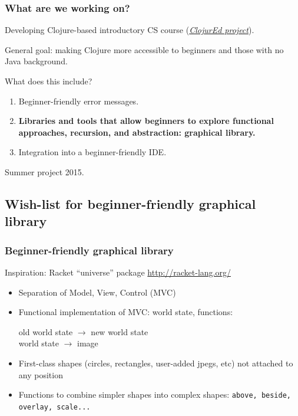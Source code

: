 \documentclass{beamer}
\begin{document}
\begin{frame}
\frametitle{What are we working on?}
Developing Clojure-based introductory CS course ({\it \href{http://cda.morris.umn.edu/~elenam/\#clojure}{ClojurEd project}}). 

General goal: making Clojure more accessible to beginners and those with no Java background. 

What does this include? 
\begin{enumerate}
\item Beginner-friendly error messages. 
\item {\bf Libraries and tools that allow beginners to explore functional approaches, recursion, and abstraction: graphical library.}
\item Integration into a beginner-friendly IDE. 
\end{enumerate}
Summer project 2015. 
\end{frame}

\subsection{Wish-list for beginner-friendly graphical library}

\begin{frame}
\frametitle{Beginner-friendly graphical library}
Inspiration: Racket ``universe'' package \href{http://racket-lang.org/}{http://racket-lang.org/}
\begin{itemize}
\item Separation of Model, View, Control (MVC) 
\item Functional implementation of MVC: world state, functions: 

\noindent
old world state $\rightarrow$ new world state \\
world state $\rightarrow$ image 
\item  First-class shapes (circles, rectangles, user-added jpegs, etc) not attached to any position
\item Functions to combine simpler shapes into complex shapes: {\tt above, beside, overlay, scale...}
\end{itemize}
\end{frame}
\end{document}
